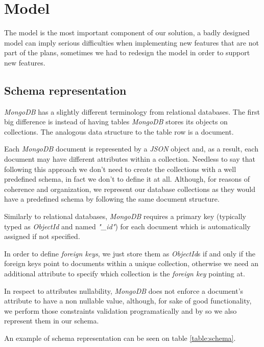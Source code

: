 \section{Model}
The model is the most important component of our solution, a badly designed model can imply serious difficulties when implementing new features that are not part of the plans, sometimes we had to redesign the model in order to support new features.

\subsection {Schema representation}
    \emph{MongoDB} has a slightly different terminology from relational databases. The first big difference is instead of having tables \emph{MongoDB} stores its objects on collections. The analogous data structure to the table row is a document.

    Each \emph{MongoDB} document is represented by a \emph{JSON} object and, as a result, each document may have different attributes within a collection. Needless to say that following this approach we don't need to create the collections with a well predefined schema, in fact we don't to define it at all. Although, for reasons of coherence and organization, we represent our database collections as they would have a predefined schema by following the same document structure.

    Similarly to relational databases, \emph{MongoDB} requires a primary key (typically typed as \emph{ObjectId} and named \emph{"\_id"}) for each document which is automatically assigned if not specified. 

    In order to define \emph{foreign keys}, we just store them as \emph{ObjectId}s if and only if the foreign keys point to documents within a unique collection, otherwise we need an additional attribute to specify which collection is the \emph{foreign key} pointing at.

    In respect to attributes nullability, \emph{MongoDB} does not enforce a document's attribute to have a non nullable value, although, for sake of good functionality, we perform those constraints validation programatically and by so we also represent them in our schema.

    An example of schema representation can be seen on table \ref{table:schema}.

